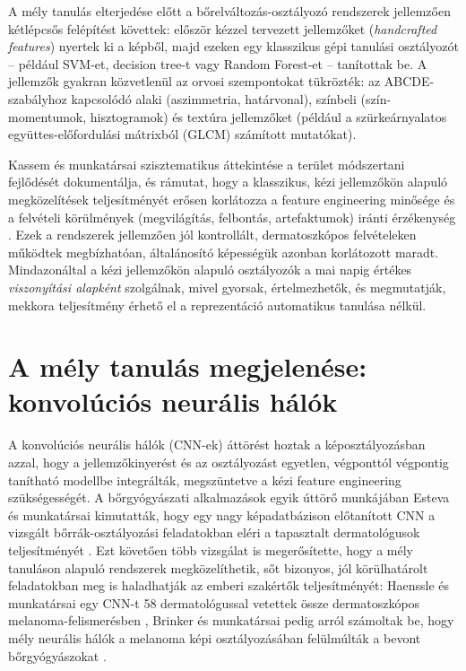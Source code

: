 A mély tanulás elterjedése előtt a bőrelváltozás-osztályozó rendszerek jellemzően
kétlépcsős felépítést követtek: először kézzel tervezett jellemzőket
(\textit{handcrafted features}) nyertek ki a képből, majd ezeken egy klasszikus
gépi tanulási osztályozót -- például SVM-et, decision tree-t vagy
Random Forest-et -- tanítottak be. A jellemzők gyakran közvetlenül
az orvosi szempontokat tükrözték: az ABCDE-szabályhoz kapcsolódó alaki
(aszimmetria, határvonal), színbeli (szín-momentumok, hisztogramok) és textúra
jellemzőket (például a szürkeárnyalatos együttes-előfordulási mátrixból
(GLCM) számított mutatókat).

Kassem és munkatársai szisztematikus áttekintése a terület módszertani
fejlődését dokumentálja, és rámutat, hogy a klasszikus, kézi jellemzőkön alapuló
megközelítések teljesítményét erősen korlátozza a feature engineering minősége és a
felvételi körülmények (megvilágítás, felbontás, artefaktumok) iránti
érzékenység \cite{kassem2021review}. Ezek a rendszerek jellemzően jól
kontrollált, dermatoszkópos felvételeken működtek megbízhatóan, általánosító
képességük azonban korlátozott maradt. Mindazonáltal a kézi jellemzőkön alapuló
osztályozók a mai napig értékes \textit{viszonyítási alapként}
szolgálnak, mivel gyorsak, értelmezhetők, és megmutatják, mekkora teljesítmény
érhető el a reprezentáció automatikus tanulása nélkül.

\section{A mély tanulás megjelenése: konvolúciós neurális hálók}

A konvolúciós neurális hálók (CNN-ek) áttörést hoztak a képosztályozásban azzal,
hogy a jellemzőkinyerést és az osztályozást egyetlen, végponttól végpontig
tanítható modellbe integrálták, megszüntetve a kézi feature engineering
szükségességét. A bőrgyógyászati alkalmazások egyik úttörő munkájában Esteva és
munkatársai kimutatták, hogy egy nagy képadatbázison előtanított CNN a vizsgált
bőrrák-osztályozási feladatokban eléri a tapasztalt dermatológusok teljesítményét
\cite{esteva2017dermatologist}. Ezt követően több vizsgálat is megerősítette,
hogy a mély tanuláson alapuló rendszerek megközelíthetik, sőt bizonyos, jól
körülhatárolt feladatokban meg is haladhatják az emberi szakértők
teljesítményét: Haenssle és munkatársai egy CNN-t 58 dermatológussal vetettek
össze dermatoszkópos melanoma-felismerésben \cite{haenssle2018man}, Brinker és
munkatársai pedig arról számoltak be, hogy mély neurális hálók a melanoma
képi osztályozásában felülmúlták a bevont bőrgyógyászokat \cite{brinker2019deep}.

